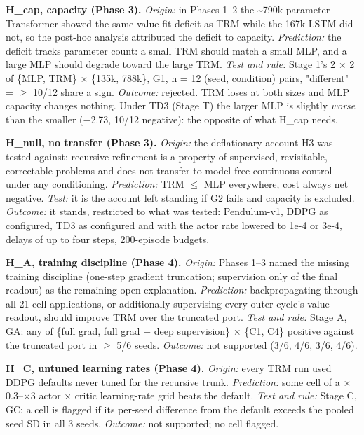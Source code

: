 \documentclass[11pt]{article}
\begin{document}
\textbf{H\_cap, capacity (Phase 3).} \emph{Origin:} in Phases 1--2 the \textasciitilde{}790k-parameter Transformer showed the same value-fit deficit as TRM while the 167k LSTM did not, so the post-hoc analysis attributed the deficit to capacity. \emph{Prediction:} the deficit tracks parameter count: a small TRM should match a small MLP, and a large MLP should degrade toward the large TRM. \emph{Test and rule:} Stage 1's 2 $\times$ 2 of \{MLP, TRM\} $\times$ \{135k, 788k\}, G1, n = 12 (seed, condition) pairs, "different" = $\geq$ 10/12 share a sign. \emph{Outcome:} rejected. TRM loses at both sizes and MLP capacity changes nothing. Under TD3 (Stage T) the larger MLP is slightly \emph{worse} than the smaller ($-$2.73, 10/12 negative): the opposite of what H\_cap needs.



\textbf{H\_null, no transfer (Phase 3).} \emph{Origin:} the deflationary account H3 was tested against: recursive refinement is a property of supervised, revisitable, correctable problems and does not transfer to model-free continuous control under any conditioning. \emph{Prediction:} TRM $\leq$ MLP everywhere, cost always net negative. \emph{Test:} it is the account left standing if G2 fails and capacity is excluded. \emph{Outcome:} it stands, restricted to what was tested: Pendulum-v1, DDPG as configured, TD3 as configured and with the actor rate lowered to 1e-4 or 3e-4, delays of up to four steps, 200-episode budgets.



\textbf{H\_A, training discipline (Phase 4).} \emph{Origin:} Phases 1--3 named the missing training discipline (one-step gradient truncation; supervision only of the final readout) as the remaining open explanation. \emph{Prediction:} backpropagating through all 21 cell applications, or additionally supervising every outer cycle's value readout, should improve TRM over the truncated port. \emph{Test and rule:} Stage A, GA: any of \{full grad, full grad + deep supervision\} $\times$ \{C1, C4\} positive against the truncated port in $\geq$ 5/6 seeds. \emph{Outcome:} not supported (3/6, 4/6, 3/6, 4/6).



\textbf{H\_C, untuned learning rates (Phase 4).} \emph{Origin:} every TRM run used DDPG defaults never tuned for the recursive trunk. \emph{Prediction:} some cell of a $\times$0.3--$\times$3 actor $\times$ critic learning-rate grid beats the default. \emph{Test and rule:} Stage C, GC: a cell is flagged if its per-seed difference from the default exceeds the pooled seed SD in all 3 seeds. \emph{Outcome:} not supported; no cell flagged.
\end{document}
